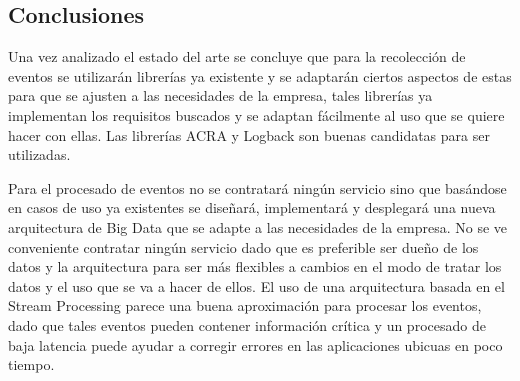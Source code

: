 \subsection{Conclusiones}
Una vez analizado el estado del arte se concluye que para la recolección de eventos se utilizarán librerías ya existente y se adaptarán ciertos aspectos de estas para que se ajusten a las necesidades de la empresa, tales librerías ya implementan los requisitos buscados y se adaptan fácilmente al uso que se quiere hacer con ellas. Las librerías ACRA y Logback son buenas candidatas para ser utilizadas.

Para el procesado de eventos no se contratará ningún servicio sino que basándose en casos de uso ya existentes se diseñará, implementará y desplegará una nueva arquitectura de Big Data que se adapte a las necesidades de la empresa. No se ve conveniente contratar ningún servicio dado que es preferible ser dueño de los datos y la arquitectura para ser más flexibles a cambios en el modo de tratar los datos y el uso que se va a hacer de ellos. El uso de una arquitectura basada en el Stream Processing parece una buena aproximación para procesar los eventos, dado que tales eventos pueden contener información crítica y un procesado de baja latencia puede ayudar a corregir errores en las aplicaciones ubicuas en poco tiempo.



